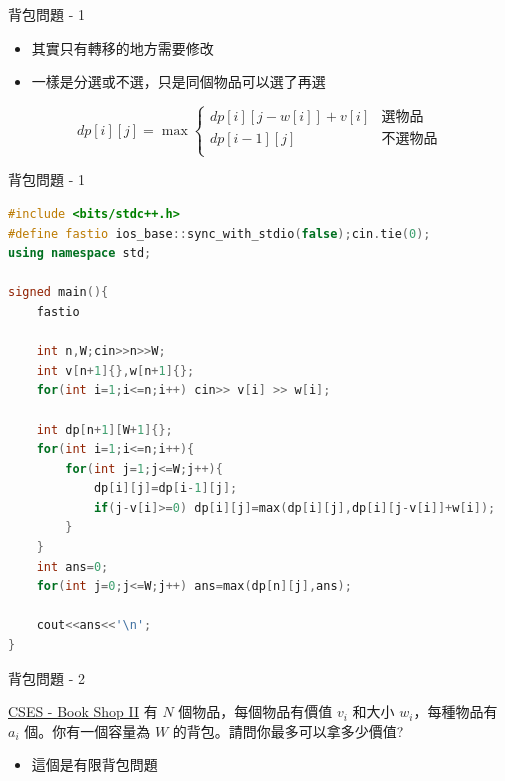 \documentclass[aspectratio=169]{beamer}
\begin{document}
    \begin{frame}{背包問題 - 1}
        \begin{itemize}
            \item 其實只有轉移的地方需要修改
            \item<2-> 一樣是分選或不選，只是同個物品可以選了再選
        \end{itemize}
        $$
        dp[i][j]= \max
        \begin{cases}
            dp[i][j-w[i]]+v[i] & \text{選物品} \\
            dp[i-1][j]           & \text{不選物品} \\
        \end{cases}
        $$
    \end{frame}
    
    \begin{frame}[fragile]{背包問題 - 1}
    \begin{lstlisting}[language=C++,basicstyle=\ttfamily \tiny]
#include <bits/stdc++.h>
#define fastio ios_base::sync_with_stdio(false);cin.tie(0);
using namespace std;

signed main(){
    fastio

    int n,W;cin>>n>>W;
    int v[n+1]{},w[n+1]{};
    for(int i=1;i<=n;i++) cin>> v[i] >> w[i];

    int dp[n+1][W+1]{};
    for(int i=1;i<=n;i++){
        for(int j=1;j<=W;j++){
            dp[i][j]=dp[i-1][j];
            if(j-v[i]>=0) dp[i][j]=max(dp[i][j],dp[i][j-v[i]]+w[i]);
        }
    }
    int ans=0;
    for(int j=0;j<=W;j++) ans=max(dp[n][j],ans);

    cout<<ans<<'\n';
}
    \end{lstlisting}
    \end{frame}
    
    \begin{frame}{背包問題 - 2}
        \begin{block}{\href{https://cses.fi/problemset/task/1159}{CSES - Book Shop II}}
            有 $N$ 個物品，每個物品有價值 $v_i$ 和大小 $w_i$，每種物品有 $a_i$ 個。你有一個容量為 $W$ 的背包。請問你最多可以拿多少價值?
        \end{block}
        \begin{itemize}
            \item 這個是有限背包問題
        \end{itemize}
    \end{frame}
    
\end{document}
